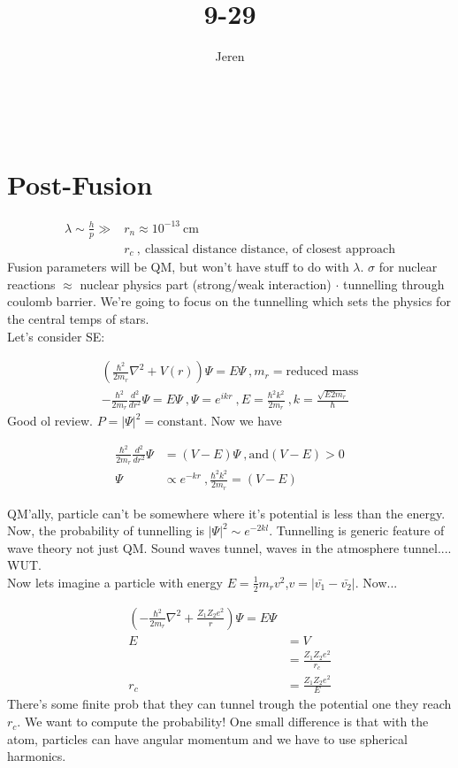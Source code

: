 \documentclass[10pt,a4paper]{article}
\author{Jeren}
\title{9-29}
\begin{document}
\\
\section{Post-Fusion}

\begin{align}
\lambda \sim \frac{h}{p} \gg & r_n \approx 10^{-13} ~\text{cm}\\
& r_c ~,~\text{classical distance distance, of closest approach}
\end{align}
Fusion parameters will be QM, but won't have stuff to do with $\lambda$. $\sigma$ for nuclear reactions $\approx$ nuclear physics part (strong/weak interaction) $\cdot$ tunnelling through coulomb barrier. We're going to focus on the tunnelling which sets the physics for the central temps of stars. \\

Let's consider SE:

\begin{align}
\left(\frac{\hbar^2}{2m_r} \nabla^2 + V(r) \right) \Psi = E\Psi~,m_r = \text{reduced mass}\\
-\frac{\hbar^2}{2m_r}\frac{d^2}{dr^2} \Psi =E\Psi~, \Psi = e^{ikr}~, E=\frac{\hbar^2 k^2}{2m_r}~,k=\frac{\sqrt{E2m_r}}{\hbar}
\end{align}
Good ol review. $P = | \Psi|^2 = \text{constant}$. Now we have

\begin{align}
\frac{\hbar^2}{2m_r}\frac{d^2}{dr^2} \Psi & = (V-E)\Psi~,\text{and} (V-E)>0\\
\Psi & \propto e^{-kr}~, \frac{\hbar^2 k^2}{2m_r} = (V-E)
\end{align}

QM'ally, particle can't be somewhere where it's potential is less than the energy. Now, the probability of tunnelling is $|\Psi|^2 \sim e^{-2kl}$. Tunnelling is generic feature of wave theory not just QM. Sound waves tunnel, waves in the atmosphere tunnel.... WUT. \\
Now lets imagine a particle with energy $E = \frac{1}{2}m_r v^2$,$v = | \bar{v_1} - \bar{v_2} |$. Now...

\begin{align}
\left( -\frac{\hbar^2}{2m_r}\nabla^2 + \frac{Z_1 Z_2 e^2}{r} \right) \Psi = E \Psi\\
E&=V\\
& = \frac{Z_1 Z_2 e^2}{r_c}\\
r_c &= \frac{Z_1 Z_2 e^2}{E}
\end{align}
There's some finite prob that they can tunnel trough the potential one they reach $r_c$. We want to compute the probability! One small difference is that with the atom, particles can have angular momentum and we have to use spherical harmonics.
\end{document}
